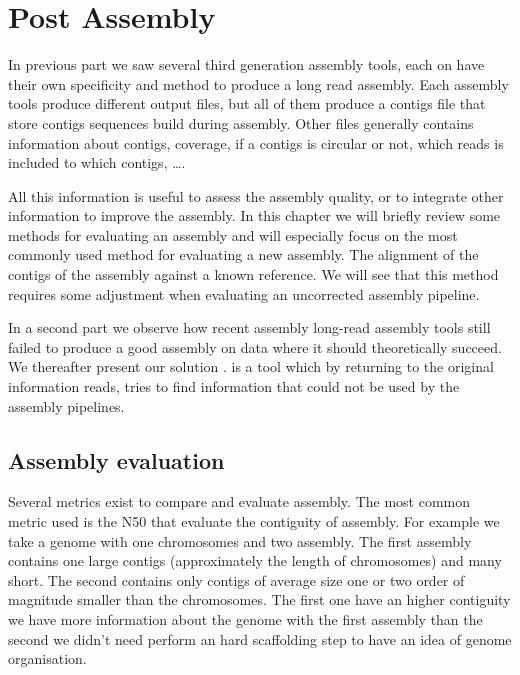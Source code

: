 \documentclass[main.tex]{subfiles}
\begin{document}
\chapter{Post Assembly} \label{chapter:postassembly}

In previous part we saw several third generation assembly tools, each on have their own specificity and method to produce a long read assembly. Each assembly tools produce different output files, but all of them produce a contigs file that store contigs sequences build during assembly. Other files generally contains information about contigs, coverage, if a contigs is circular or not, which reads is included to which contigs, ….

All this information is useful to assess the assembly quality, or to integrate other information to improve the assembly. In this chapter we will briefly review some methods for evaluating an assembly and will especially focus on the most commonly used method for evaluating a new assembly. 
The alignment of the contigs of the assembly against a known reference.%
We will see that this method requires some adjustment when evaluating an uncorrected assembly pipeline.

In a second part we  observe how recent assembly long-read assembly tools still failed to produce a good assembly on data where  it should  theoretically succeed. We thereafter present our solution \knot. \knot is a tool which by returning to the original information reads, tries to find information that could not be used by the assembly pipelines.%


\section{Assembly evaluation} 

Several metrics exist to compare and evaluate assembly. The most common metric used is the N50 that evaluate the contiguity of assembly. For example we take a genome with one chromosomes and two assembly. The first assembly contains one large contigs (approximately the length of chromosomes) and many short. The second contains only contigs of average size one or two order of magnitude smaller than the chromosomes. The first one have an higher contiguity we have more information about the genome with the first assembly than the second we didn't need perform an hard scaffolding step to have an idea of genome organisation.
\end{document}
